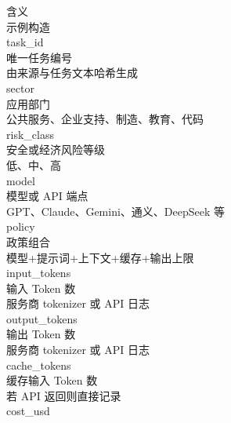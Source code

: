 含义\\

示例构造\\

task_id\\

唯一任务编号\\

由来源与任务文本哈希生成\\

sector\\

应用部门\\

公共服务、企业支持、制造、教育、代码\\

risk_class\\

安全或经济风险等级\\

低、中、高\\

model\\

模型或 API 端点\\

GPT、Claude、Gemini、通义、DeepSeek 等\\

policy\\

政策组合\\

模型+提示词+上下文+缓存+输出上限\\

input_tokens\\

输入 Token 数\\

服务商 tokenizer 或 API 日志\\

output_tokens\\

输出 Token 数\\

服务商 tokenizer 或 API 日志\\

cache_tokens\\

缓存输入 Token 数\\

若 API 返回则直接记录\\

cost_usd\\

